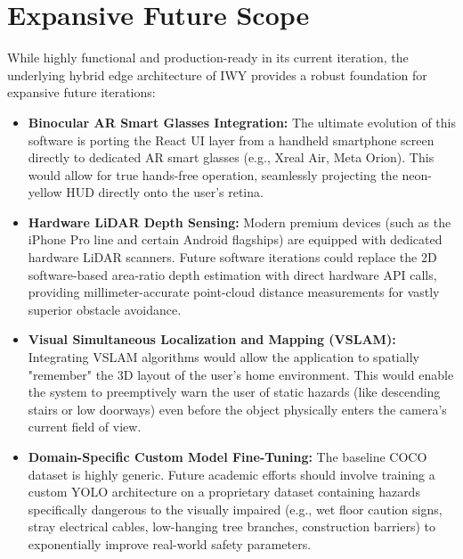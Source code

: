 \documentclass[12pt, a4paper]{report}
\begin{document}
\section{Expansive Future Scope}
While highly functional and production-ready in its current iteration, the underlying hybrid edge architecture of IWY provides a robust foundation for expansive future iterations:
\begin{itemize}
    \item \textbf{Binocular AR Smart Glasses Integration:} The ultimate evolution of this software is porting the React UI layer from a handheld smartphone screen directly to dedicated AR smart glasses (e.g., Xreal Air, Meta Orion). This would allow for true hands-free operation, seamlessly projecting the neon-yellow HUD directly onto the user's retina.
    \item \textbf{Hardware LiDAR Depth Sensing:} Modern premium devices (such as the iPhone Pro line and certain Android flagships) are equipped with dedicated hardware LiDAR scanners. Future software iterations could replace the 2D software-based area-ratio depth estimation with direct hardware API calls, providing millimeter-accurate point-cloud distance measurements for vastly superior obstacle avoidance.
    \item \textbf{Visual Simultaneous Localization and Mapping (VSLAM):} Integrating VSLAM algorithms would allow the application to spatially "remember" the 3D layout of the user's home environment. This would enable the system to preemptively warn the user of static hazards (like descending stairs or low doorways) even before the object physically enters the camera's current field of view.
    \item \textbf{Domain-Specific Custom Model Fine-Tuning:} The baseline COCO dataset is highly generic. Future academic efforts should involve training a custom YOLO architecture on a proprietary dataset containing hazards specifically dangerous to the visually impaired (e.g., wet floor caution signs, stray electrical cables, low-hanging tree branches, construction barriers) to exponentially improve real-world safety parameters.
\end{itemize}
\end{document}
